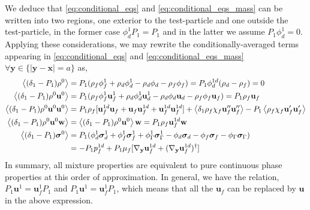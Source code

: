 We deduce that \ref{eq:conditional_eqs} and \ref{eq:conditional_eqs_mass} can be written into two regions, one exterior to the test-particle and one outside the test-particle, in the former case $\phi_d^1P_1  = P_1$ and in the latter we assume $P_1 \phi_d^1 = 0$. 
Applying these considerations, we may rewrite the conditionally-averaged terms appearing in \ref{eq:conditional_eqs} and \ref{eq:conditional_eqs_mass}  $\forall \textbf{y}\in \{|\textbf{y}-\textbf{x}| = a\}$ as, 
\begin{align*}
    \left<(\delta_1 - P_1)\rho^0\right>
    &=
    P_1 
    (\rho_f\phi_f^1+ \rho_d\phi_d^1 - \rho_d\phi_d - \rho_f\phi_f) 
    = P_1 \phi_d^{1d} (\rho_d - \rho_f)
    = 0
    \\ 
    \left<(\delta_1 - P_1)\rho^0\textbf{u}^0\right>
    &= 
    P_1 (
    \rho_f \phi_f^1 \textbf{u}^{1}_f
    + \rho_d \phi_d^1 \textbf{u}^{1}_d
    - \rho_d \phi_d \textbf{u}_d
    - \rho_f \phi_f \textbf{u}_f
    )
    = P_1 \rho_f \textbf{u}_f
    \\
    \left<(\delta_1 - P_1)\rho^0\textbf{u}^0\textbf{u}^0\right>
    &=
    P_1\rho_f[
        \textbf{u}^{1d}_f\textbf{u}_f
        + \textbf{u}_f\textbf{u}^{1d}_f
        + \textbf{u}^{1d}_f\textbf{u}^{1d}_f
    ]
    + \left<\delta_1\rho_f\chi_f\textbf{u}_f''\textbf{u}_f''\right>
    - P_1 \left<\rho_f\chi_f\textbf{u}_f'\textbf{u}_f'\right>\\
    \left<(\delta_1 - P_1)\rho^0 \textbf{u}^0 \textbf{w}\right>
    &= 
    \left<(\delta_1 - P_1)\rho^0 \textbf{u}^0\right> \textbf{w}
    =
    P_1 \rho_f \textbf{u}_f^{1d} \textbf{w}
    \\
    \left<(\delta_1 - P_1) \bm\sigma^0\right> 
    &= 
    P_1 (
        \phi_d^1 \bm\sigma^1_d 
        + \phi_f^1 \bm\sigma^1_f 
        + \phi_\Gamma^1 \bm\sigma^1_\Gamma 
        - \phi_d \bm\sigma_d 
        - \phi_f \bm\sigma_f 
        - \phi_\Gamma \bm\sigma_\Gamma 
    ) \\
    &= 
    -P_1  p^{1d}_f 
    +P_1 \mu_f [{\mathbf{\nabla}_\textbf{y}} \textbf{u}^{1d}_f +({\mathbf{\nabla}_\textbf{y}} \textbf{u}^{1d}_f)^\dagger ]
\end{align*}
In summary, all mixture properties are equivalent to pure continuous phase properties at this order of approximation. 
In general, we have the relation, $P_1 \textbf{u}^1 = \textbf{u}_f^1P_1$ and  $P_1 \textbf{u}^1 = \textbf{u}_f^1P_1$, which means that all the $\textbf{u}_f$ can be replaced by $\textbf{u}$ in the above expression. 

